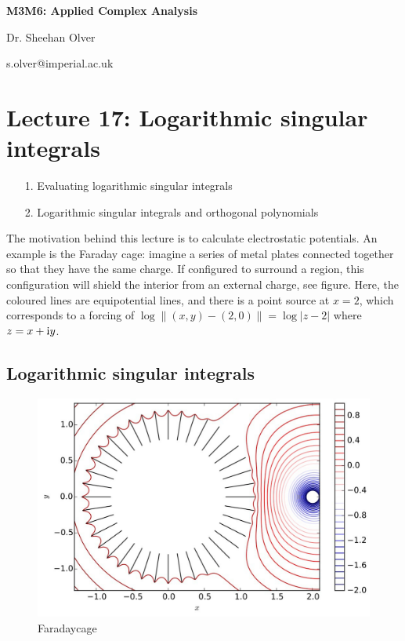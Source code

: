 \documentclass[12pt,a4paper]{article}
\def\I{ {\rm i} }
\begin{document}
\textbf{M3M6: Applied Complex Analysis}

Dr. Sheehan Olver

s.olver@imperial.ac.uk

\section{Lecture 17: Logarithmic singular integrals}
\begin{itemize}
\item[1. ] Evaluating logarithmic singular integrals


\item[2. ] Logarithmic singular integrals and orthogonal polynomials

\end{itemize}
The motivation behind this lecture is to calculate electrostatic potentials.  An example is the Faraday cage: imagine a series of metal plates connected together so that they have the same charge.  If configured to surround a region, this configuration will shield the interior from an external charge, see figure. Here, the coloured lines are equipotential lines, and there is a point source at $x = 2$, which corresponds to a forcing of  $\log\| (x,y)  - (2,0) \| = \log|z - 2|$ where  $z = x + \I y$. 

\subsection{Logarithmic singular integrals}
\begin{figure}
\centering
\includegraphics{Laplacetangentialplot.pdf}
\caption{Faradaycage}
\end{figure}
\end{document}
